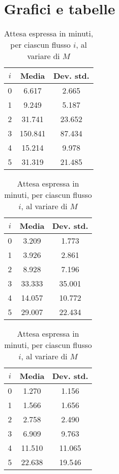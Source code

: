 \section{Grafici e tabelle}
\begin{table}[ht]
\centering
\begin{subtable}{0.33\textwidth}
\centering
{\tablecolors
\begin{tabular}{|c|c|c|}
\hline
$i$ & Media & Dev. std. \\
\hline
0 & 6.617 & 2.665 \\
\hline
1 & 9.249 & 5.187 \\
\hline
2 & 31.741 & 23.652 \\
\hline
3 & {\color{red}150.841} & 87.434 \\
\hline
4 & 15.214 & 9.978 \\
\hline
5 & 31.319 & 21.485 \\
\hline
\end{tabular}}
\caption{$M = 3$}
\label{table:esperimenti-simulazione-1a}
\end{subtable}%
\begin{subtable}{0.33\textwidth}
\centering
{\tablecolors
\begin{tabular}{|c|c|c|}
\hline
$i$ & Media & Dev. std. \\
\hline
0 & 3.209 & 1.773 \\
\hline
1 & 3.926 & 2.861 \\
\hline
2 & 8.928 & 7.196 \\
\hline
3 & 33.333 & 35.001 \\
\hline
4 & 14.057 & 10.772 \\
\hline
5 & 29.007 & 22.434 \\
\hline
\end{tabular}}
\caption{$M = 4$}
\end{subtable}%
\begin{subtable}{0.33\textwidth}
\centering
{\tablecolors
\begin{tabular}{|c|c|c|}
\hline
$i$ & Media & Dev. std. \\
\hline
0 & 1.270 & 1.156 \\
\hline
1 & 1.566 & 1.656 \\
\hline
2 & 2.758 & 2.490 \\
\hline
3 & 6.909 & 9.763 \\
\hline
4 & 11.510 & 11.065 \\
\hline
5 & 22.638 & 19.546 \\
\hline
\end{tabular}}
\caption{$M = 5$}
\end{subtable}
\caption{Attesa espressa in minuti, per ciascun flusso $i$, al variare di $M$}
\label{table:esperimenti-simulazione-1}
\end{table}

